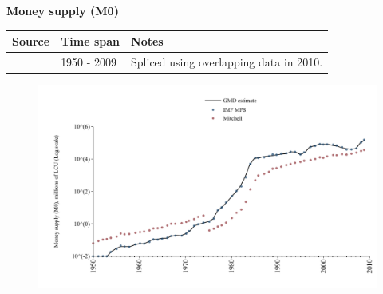 \documentclass[12pt,a4paper,landscape]{article}
\begin{document}
\begin{adjustbox}{max totalsize={\paperwidth}{\paperheight},center}
\begin{minipage}[t][\textheight][t]{\textwidth}
\vspace*{0.5cm}
{}
\begin{center}
{\Large\bfseries Money supply (M0)}
\end{center}
\vspace{0.5cm}
\begin{table}[H]
\centering
\small
\begin{tabular}{|l|l|l|}
\hline
\textbf{Source} & \textbf{Time span} & \textbf{Notes} \\
\hline
\rowcolor{white}\cite{IMF_MFS}& 1950 - 2009 &Spliced using overlapping data in 2010. \\
\hline
\end{tabular}
\end{table}
\begin{figure}[H]
\centering
\includegraphics[width=\textwidth,height=0.6\textheight,keepaspectratio]{graphs/ISR_M0.pdf}
\end{figure}
\end{minipage}
\end{adjustbox}
\end{document}
